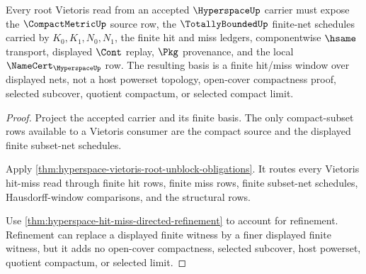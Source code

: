 \begin{theorem}
\label{thm:hyperspace-root-vietoris-net-basis}
Every root Vietoris read from an accepted $\HyperspaceUp$ carrier must expose the $\CompactMetricUp$ source row, the $\TotallyBoundedUp$ finite-net schedules carried by $K_0,K_1,N_0,N_1$, the finite hit and miss ledgers, componentwise $\hsame$ transport, displayed $\Cont$ replay, $\Pkg$ provenance, and the local $\NameCert_{\HyperspaceUp}$ row. The resulting basis is a finite hit/miss window over displayed nets, not a host powerset topology, open-cover compactness proof, selected subcover, quotient compactum, or selected compact limit.
\end{theorem}
\begin{proof}
Project the accepted carrier and its finite basis. The only compact-subset rows available to a Vietoris consumer are the compact source and the displayed finite subset-net schedules.

Apply \autoref{thm:hyperspace-vietoris-root-unblock-obligations}. It routes every Vietoris hit-miss read through finite hit rows, finite miss rows, finite subset-net schedules, Hausdorff-window comparisons, and the structural rows.

Use \autoref{thm:hyperspace-hit-miss-directed-refinement} to account for refinement. Refinement can replace a displayed finite witness by a finer displayed finite witness, but it adds no open-cover compactness, selected subcover, host powerset, quotient compactum, or selected limit.
\end{proof}

